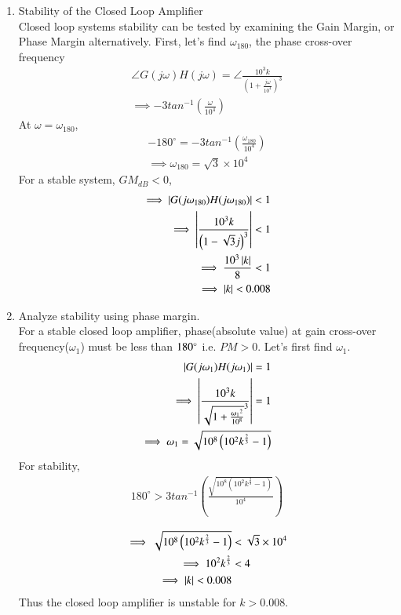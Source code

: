 \begin{enumerate}[label=\arabic*.,ref=\theenumi]
\item Stability of the Closed Loop Amplifier\\
\solution Closed loop systems stability can be tested by examining the Gain Margin, or Phase Margin alternatively. First, let's find $\omega_{180}$, the phase cross-over frequency
\begin{align}
       \angle G(j\omega)H(j\omega) =  \angle\frac{10^3k}{\left(1+\frac{j\omega}{10^4}\right)^3}\\
       \implies -3tan^{-1}\left({\frac{\omega}{10^4}}\right)
\end{align}
At $\omega = \omega_{180}$,
\begin{align}
       -180^{\circ}= {-3tan^{-1}\left({\frac{\omega_{180}}{10^4}}\right)}\\
        \implies \omega_{180} = \sqrt{3}\times 10^4
\end{align}
For a stable system, $GM_{dB}<0$,
\begin{align}
    \implies \left\vert G(j\omega_{180})H(j\omega_{180})\right\vert< 1 \\
    \implies \left\vert\frac{10^3k}{\left(1-\sqrt{3}j\right)^3} \right\vert < 1\\
     \implies \frac{10^3\left\vert k\right\vert}{8} < 1 \\
     \implies \left\vert k\right\vert < 0.008
\end{align}

\item Analyze stability using phase margin.\\
\solution For a stable closed loop amplifier, phase(absolute value) at gain cross-over frequency($\omega_{1}$) must be less than $180\degree$ i.e. $PM>0$. Let's first find $\omega_{1}$.
\begin{align}
     \left\vert G(j\omega_{1})H(j\omega_{1})\right\vert= 1  \\
   \implies \left\vert\frac{10^3k}{{\sqrt{1+\frac{{\omega_{1}}^2}{10^8}}}^3}\right\vert=1\\
  \implies \omega_{1}=\sqrt{10^8\left(10^2k^{\frac{2}{3}}-1\right)}
\end{align}
For stability,
\begin{align}
  180^{\circ}>3tan^{-1}\left({\frac{\sqrt{10^8\left(10^2k^{\frac{2}{3}}-1\right)}}{10^4}}\right)\\
\end{align}
\begin{align}
  \implies \sqrt{10^8\left(10^2k^{\frac{2}{3}}-1\right)}&<\sqrt{3} \times 10^4\\
    \implies 10^2k^{\frac{2}{3}}&<4\\
\implies \left\vert k\right\vert<0.008
\end{align}
Thus the closed loop amplifier is unstable for $k>0.008$.


\end{enumerate}
